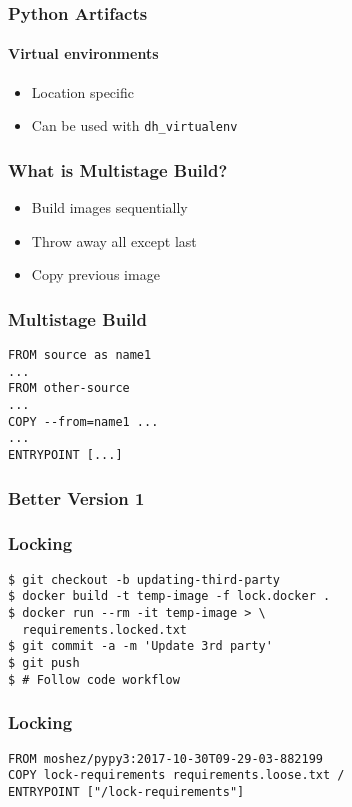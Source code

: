 \documentclass{beamer}
\begin{document}
\begin{frame}[fragile]
\frametitle{Python Artifacts}
\framesubtitle{Virtual environments}
\begin{itemize}
\item Location specific
\item Can be used with \verb|dh_virtualenv|
\end{itemize}
\end{frame}

\begin{frame}[fragile]
\frametitle{What is Multistage Build?}
\begin{itemize}
\item Build images sequentially \pause
\item Throw away all except last \pause
\item Copy previous image
\end{itemize}
\end{frame}

\begin{frame}[fragile]
\frametitle{Multistage Build}
\begin{lstlisting}
FROM source as name1
...
FROM other-source
...
COPY --from=name1 ...
...
ENTRYPOINT [...]
\end{lstlisting}
\end{frame}

\begin{frame}[fragile]
\frametitle{Better Version 1}
\pause
\pause
\pause
\pause

\end{frame}

\begin{frame}[fragile]
\frametitle{Locking}
\begin{lstlisting}
$ git checkout -b updating-third-party
$ docker build -t temp-image -f lock.docker .
$ docker run --rm -it temp-image > \
  requirements.locked.txt
$ git commit -a -m 'Update 3rd party'
$ git push
$ # Follow code workflow
\end{lstlisting}
\end{frame}

\begin{frame}[fragile]
\frametitle{Locking}
\begin{lstlisting}
FROM moshez/pypy3:2017-10-30T09-29-03-882199
COPY lock-requirements requirements.loose.txt /
ENTRYPOINT ["/lock-requirements"]
\end{lstlisting}
\end{frame}
\end{document}

